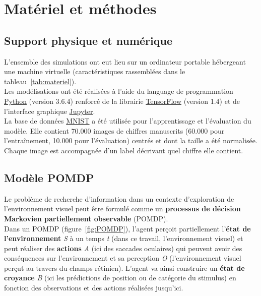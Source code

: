 
\chapter{Matériel et méthodes} %
\label{Materiel_methode} %


\section{Support physique et numérique} %
L'ensemble des simulations ont eut lieu sur un ordinateur portable hébergeant une machine virtuelle (caractéristiques rassemblées dans le tableau~\ref{tab:materiel}).\\
Les modélisations ont été réalisées à l'aide du language de programmation \href{https://www.python.org/}{Python} (version 3.6.4) renforcé de la librairie \href{https://www.tensorflow.org/}{TensorFlow} (version 1.4) et de l'interface graphique \href{https://jupyter.org/}{Jupyter}.\\
La base de données \href{http://yann.lecun.com/exdb/mnist/}{MNIST} a été utilisée pour l'apprentissage et l'évaluation du modèle. Elle contient 70.000 images de chiffres manuscrits (60.000 pour l'entraînement, 10.000 pour l'évaluation) centrés et dont la taille a été normalisée. Chaque image est accompagnée d'un label décrivant quel chiffre elle contient.


\section{Modèle POMDP} %
Le problème de recherche d'information dans un contexte d'exploration de l'environnement visuel peut être formulé comme un \textbf{processus de décision Markovien partiellement observable} (POMDP). \autocite{Butko2010} \\
Dans un POMDP (figure~\ref{fig:POMDP}), l'agent perçoit partiellement l'\textbf{état de l'environnement} \textit{S} à un temps \textit{t} (dans ce travail, l'environnement visuel) et peut réaliser des \textbf{actions} \textit{A} (ici des saccades oculaires) qui peuvent avoir des conséquences sur l'environnement et sa perception \textit{O} (l'environnement visuel perçut au travers du champs rétinien). L'agent va ainsi construire un \textbf{état de croyance} \textit{B} (ici les prédictions de position ou de catégorie du stimulus) en fonction des observations et des actions réalisées jusqu'ici. \autocite{Butko2010, Potthast2016} \\

